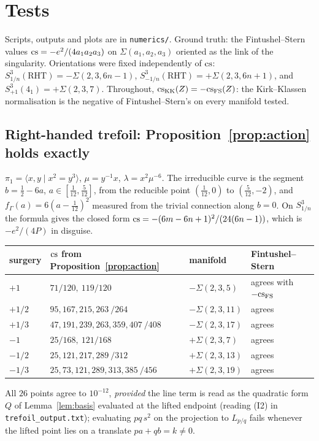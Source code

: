 \section{Tests}\label{sec:tests}
Scripts, outputs and plots are in \texttt{numerics/}.  Ground truth: the Fintushel--Stern values
$\mathrm{cs}=-e^2/(4a_1a_2a_3)$ on $\Sigma(a_1,a_2,a_3)$ oriented as the link of the singularity.  Orientations were fixed
independently of $\mathrm{cs}$: $S^3_{1/n}(\text{RHT})=-\Sigma(2,3,6n-1)$, $S^3_{-1/n}(\text{RHT})=+\Sigma(2,3,6n+1)$, and
$S^3_{+1}(4_1)=+\Sigma(2,3,7)$.  Throughout, $\mathrm{cs}_{\rm KK}(Z)=-\mathrm{cs}_{\rm FS}(Z)$: the Kirk--Klassen normalisation is the
negative of Fintushel--Stern's on every manifold tested.

\subsection{Right-handed trefoil: Proposition~\ref{prop:action} holds exactly}
$\pi_1=\langle x,y\mid x^2=y^3\rangle$, $\mu=y^{-1}x$, $\lambda=x^2\mu^{-6}$.  The irreducible curve is the segment
$b=\tfrac12-6a$, $a\in[\tfrac1{12},\tfrac5{12}]$, from the reducible point $(\tfrac1{12},0)$ to $(\tfrac5{12},-2)$, and
$f_\Gamma(a)=6(a-\tfrac1{12})^2$ measured from the trivial connection along $b=0$.  On $S^3_{1/n}$ the formula gives
the closed form $\mathrm{cs}=-(6m-6n+1)^2/(24(6n-1))$, which is $-e^2/(4P)$ in disguise.
\begin{center}\small
\begin{tabular}{llll}
\toprule
surgery & $\mathrm{cs}$ from Proposition~\ref{prop:action} & manifold & Fintushel--Stern\\
\midrule
$+1$ & $71/120,\ 119/120$ & $-\Sigma(2,3,5)$ & agrees with $-\mathrm{cs}_{\rm FS}$\\
$+1/2$ & $95,167,215,263\ /264$ & $-\Sigma(2,3,11)$ & agrees\\
$+1/3$ & $47,191,239,263,359,407\ /408$ & $-\Sigma(2,3,17)$ & agrees\\
$-1$ & $25/168,\ 121/168$ & $+\Sigma(2,3,7)$ & agrees\\
$-1/2$ & $25,121,217,289\ /312$ & $+\Sigma(2,3,13)$ & agrees\\
$-1/3$ & $25,73,121,289,313,385\ /456$ & $+\Sigma(2,3,19)$ & agrees\\
\bottomrule
\end{tabular}
\end{center}
All $26$ points agree to $10^{-12}$, \emph{provided} the line term is read as the quadratic form $Q$ of
Lemma~\ref{lem:basis} evaluated at the lifted endpoint (reading (I2) in \texttt{trefoil\_output.txt}); evaluating
$pq\,s^2$ on the projection to $L_{p/q}$ fails whenever the lifted point lies on a translate $pa+qb=k\ne0$.

